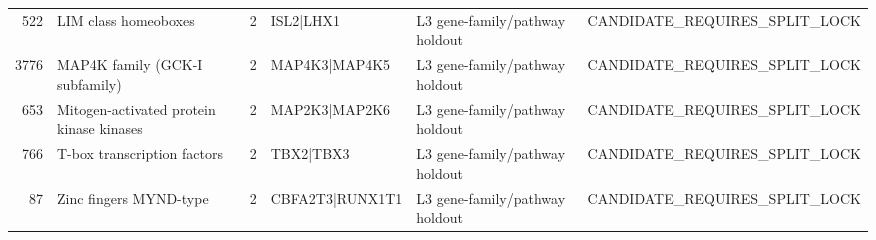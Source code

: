 \begin{tabular}{rlrlll}
522 & LIM class homeoboxes & 2 & ISL2|LHX1 & L3 gene-family/pathway holdout & CANDIDATE_REQUIRES_SPLIT_LOCK \\
3776 & MAP4K family (GCK-I subfamily) & 2 & MAP4K3|MAP4K5 & L3 gene-family/pathway holdout & CANDIDATE_REQUIRES_SPLIT_LOCK \\
653 & Mitogen-activated protein kinase kinases & 2 & MAP2K3|MAP2K6 & L3 gene-family/pathway holdout & CANDIDATE_REQUIRES_SPLIT_LOCK \\
766 & T-box transcription factors & 2 & TBX2|TBX3 & L3 gene-family/pathway holdout & CANDIDATE_REQUIRES_SPLIT_LOCK \\
87 & Zinc fingers MYND-type & 2 & CBFA2T3|RUNX1T1 & L3 gene-family/pathway holdout & CANDIDATE_REQUIRES_SPLIT_LOCK \\
\bottomrule
\end{tabular}

